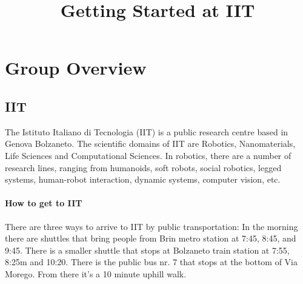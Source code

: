 \documentclass[]{article}
\title{Getting Started at IIT}
\author{}
\begin{document}

\maketitle
\tableofcontents
\pagebreak
\section{Group Overview}
\subsection{IIT}
The Istituto Italiano di Tecnologia (IIT) is a public research centre based in Genova Bolzaneto.
The scientific domains of IIT are Robotics, Nanomaterials, Life Sciences and Computational Sciences.
In robotics, there are a number of research lines, ranging from humanoids, soft robots, social robotics, legged systems, human-robot interaction, dynamic systems, computer vision, etc.
\paragraph{How to get to IIT} 
There are three ways to arrive to IIT by public transportation: In the morning there are shuttles that bring people from Brin metro station at 7:45, 8:45, and 9:45. 
There is a smaller shuttle that stops at Bolzaneto train station at 7:55, 8:25m and 10:20.
There is the public bus nr. 7 that stops at the bottom of Via Morego. From there it's a 10 minute uphill walk.
\end{document}

